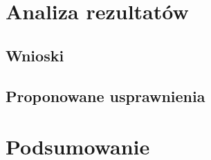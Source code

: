 \chapter{Analiza rezultatów}\label{Chapter_AnalizaRezultatow}

\section{Wnioski}\label{Section_Wnioski}

\section{Proponowane usprawnienia}\label{Section_Usprawnienia}
\cite{HandOverFaceOcclusion07}

\chapter{Podsumowanie}\label{Section_Podsumowanie}